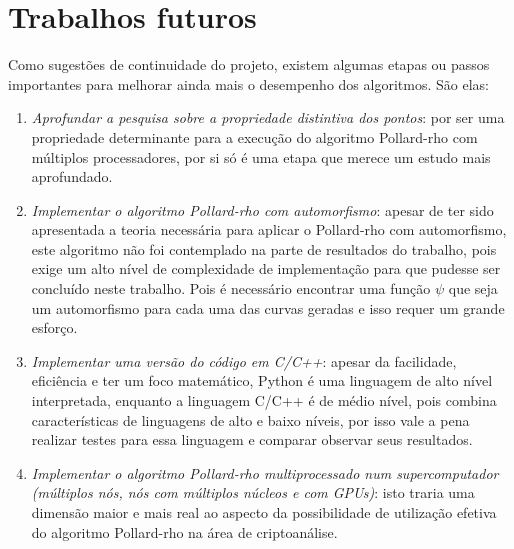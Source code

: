 \section{Trabalhos futuros}
Como sugestões de continuidade do projeto, existem algumas etapas ou passos importantes para melhorar ainda mais o desempenho dos algoritmos. São elas:

\begin{enumerate}
	\item \textit{Aprofundar a pesquisa sobre a propriedade distintiva dos pontos}: por ser uma propriedade determinante para a execução do algoritmo Pollard-rho com múltiplos processadores, por si só é uma etapa que merece um estudo mais aprofundado.
	\item \textit{Implementar o algoritmo Pollard-rho com automorfismo}: apesar de ter sido apresentada a teoria necessária para aplicar o Pollard-rho com automorfismo, este algoritmo não foi contemplado na parte de resultados do trabalho, pois exige um alto nível de complexidade de implementação para que pudesse ser concluído neste trabalho. Pois é necessário encontrar uma função \(\psi\) que seja um automorfismo para cada uma das curvas geradas e isso requer um grande esforço.
	\item \textit{Implementar uma versão do código em C/C++}: apesar da facilidade, eficiência e ter um foco matemático, Python é uma linguagem de alto nível interpretada, enquanto a linguagem C/C++ é de médio nível, pois combina características de linguagens de alto e baixo níveis, por isso vale a pena realizar testes para essa linguagem e comparar observar seus resultados.
	\item \textit{Implementar o algoritmo Pollard-rho multiprocessado num supercomputador (múltiplos nós, nós com múltiplos núcleos e com GPUs)}: isto traria uma  dimensão maior e mais real ao aspecto da possibilidade de utilização efetiva do algoritmo Pollard-rho na área de criptoanálise.
\end{enumerate}
